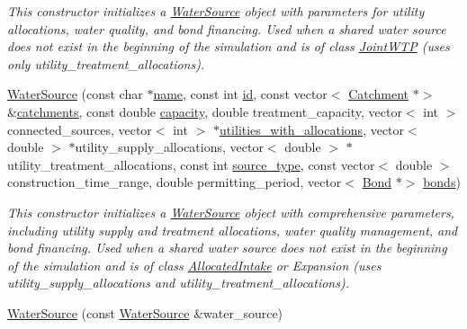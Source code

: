 \begin{DoxyCompactItemize}
\begin{DoxyCompactList}\small\item\em This constructor initializes a {\ttfamily \mbox{\hyperlink{classWaterSource}{Water\+Source}}} object with parameters for utility allocations, water quality, and bond financing. Used when a shared water source does not exist in the beginning of the simulation and is of class {\ttfamily \mbox{\hyperlink{classJointWTP}{Joint\+W\+TP}}} (uses only {\ttfamily utility\+\_\+treatment\+\_\+allocations}). \end{DoxyCompactList}\item 
\mbox{\hyperlink{classWaterSource_a5d02f9dc15b18572bbfa945aeec4dbb0}{Water\+Source}} (const char $\ast$\mbox{\hyperlink{classWaterSource_a846ea74c5b453d014f594d41fee8c765}{name}}, const int \mbox{\hyperlink{classWaterSource_a6eafe5dfefd317877d1244e8a7c6e742}{id}}, const vector$<$ \mbox{\hyperlink{classCatchment}{Catchment}} $\ast$$>$ \&\mbox{\hyperlink{classWaterSource_a8c18c34f23f8a06685c1d12f462ed830}{catchments}}, const double \mbox{\hyperlink{classWaterSource_a2ec257b415b248214a8bce7fc5267723}{capacity}}, double treatment\+\_\+capacity, vector$<$ int $>$ connected\+\_\+sources, vector$<$ int $>$ $\ast$\mbox{\hyperlink{classWaterSource_ac345583fc2d0f7e1db31ee40244d7ace}{utilities\+\_\+with\+\_\+allocations}}, vector$<$ double $>$ $\ast$utility\+\_\+supply\+\_\+allocations, vector$<$ double $>$ $\ast$utility\+\_\+treatment\+\_\+allocations, const int \mbox{\hyperlink{classWaterSource_afdd12c29fc74ea21dff1f1be9b8c2b7b}{source\+\_\+type}}, const vector$<$ double $>$ construction\+\_\+time\+\_\+range, double permitting\+\_\+period, vector$<$ \mbox{\hyperlink{classBond}{Bond}} $\ast$$>$ \mbox{\hyperlink{classWaterSource_a413b094e11bdce62f4d82e5bb9e4706e}{bonds}})
\begin{DoxyCompactList}\small\item\em This constructor initializes a {\ttfamily \mbox{\hyperlink{classWaterSource}{Water\+Source}}} object with comprehensive parameters, including utility supply and treatment allocations, water quality management, and bond financing. Used when a shared water source does not exist in the beginning of the simulation and is of class {\ttfamily \mbox{\hyperlink{classAllocatedIntake}{Allocated\+Intake}}} or {\ttfamily Expansion} (uses {\ttfamily utility\+\_\+supply\+\_\+allocations} and {\ttfamily utility\+\_\+treatment\+\_\+allocations}). \end{DoxyCompactList}\item 
\mbox{\hyperlink{classWaterSource_aaa3aba0a9709cc1432f85f443b033a65}{Water\+Source}} (const \mbox{\hyperlink{classWaterSource}{Water\+Source}} \&water\+\_\+source)

\end{DoxyCompactItemize}
